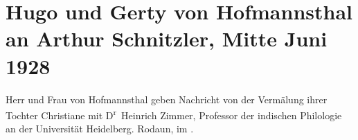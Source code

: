 

         
         \renewcommand{\erwaehntePersonen}{Personen: Christiane von Hofmannsthal, Heinrich Zimmer}
         \renewcommand{\erwaehnteInstitutionen}{Institutionen: Ruprecht-Karls-Universität Heidelberg}
         \renewcommand{\erwaehnteOrte}{Orte: Rodaun, Wien}
         \renewcommand{\erwaehnteWerke}{}
               \section[Hugo und Gerty von Hofmannsthal an Arthur Schnitzler, Mitte Juni 1928]{ Hugo und Gerty von Hofmannsthal an Arthur Schnitzler, Mitte Juni
               1928}\nopagebreak{}\rehead{ }\begin{ledgroupsized}[t]{13cm}\normalsize\beginnumbering \toendnotes[C]{\smallbreak\pagebreak[2]} 
\toendnotes[C]{\smallbreak}\pstart
           \noindent{}{\pb}Herr und Frau von Hofmannsthal geben Nachricht von der
               Vermälung ihrer Tochter Christiane
               mit D\textsuperscript{r} Heinrich
                  Zimmer, Professor der indischen Philologie an der Universität Heidelberg.\pend
           \pstart
           Rodaun, im \label{K_L02502-1v}\label{K_L02502-1h}.\pend
           
         
         \endnumbering{}\end{ledgroupsized}  \newcommand{\dateiname}{L02502}\newcommand{\titel}{Hugo und Gerty von Hofmannsthal an Arthur Schnitzler, Mitte Juni 1928}\newcommand{\editorInnen}{Martin Anton Müller und Gerd-Hermann Susen}
      